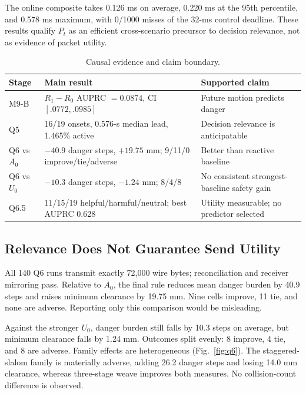 \documentclass[letterpaper,10pt,conference]{ieeeconf}
\begin{document}
The online composite takes 0.126 ms on average, 0.220 ms at the 95th
percentile, and 0.578 ms maximum, with 0/1000 misses of the 32-ms control
deadline. These results qualify $P_t$ as an efficient cross-scenario precursor
to decision relevance, not as evidence of packet utility.

\begin{table}[t]
\centering
\caption{Causal evidence and claim boundary.}
\label{tab:results}
\footnotesize
\setlength{\tabcolsep}{3.2pt}
\begin{tabular}{@{}p{}p{}p{}@{}}
\toprule
Stage & Main result & Supported claim \\
\midrule
M9-B & $R_1-R_0$ AUPRC $=0.0874$, CI $[.0772,.0985]$ & Future motion predicts danger \\
Q5 & 16/19 onsets, 0.576-s median lead, 1.465\% active & Decision relevance is anticipatable \\
Q6 vs $A_0$ & $-40.9$ danger steps, $+19.75$ mm; 9/11/0 improve/tie/adverse & Better than reactive baseline \\
Q6 vs $U_0$ & $-10.3$ danger steps, $-1.24$ mm; 8/4/8 & No consistent strongest-baseline safety gain \\
Q6.5 & 11/15/19 helpful/harmful/neutral; best AUPRC 0.628 & Utility measurable; no predictor selected \\
\bottomrule
\end{tabular}
\end{table}

\subsection{Relevance Does Not Guarantee Send Utility}
All 140 Q6 runs transmit exactly 72,000 wire bytes; reconciliation and receiver
mirroring pass. Relative to $A_0$, the final rule reduces mean danger burden by
40.9 steps and raises minimum clearance by 19.75 mm. Nine cells improve, 11
tie, and none are adverse. Reporting only this comparison would be misleading.

Against the stronger $U_0$, danger burden still falls by 10.3 steps on average,
but minimum clearance falls by 1.24 mm. Outcomes split evenly: 8 improve, 4
tie, and 8 are adverse. Family effects are heterogeneous
(Fig.~\ref{fig:q6}). The staggered-slalom family is materially adverse, adding
26.2 danger steps and losing 14.0 mm clearance, whereas three-stage weave
improves both measures. No collision-count difference is observed.
\end{document}
